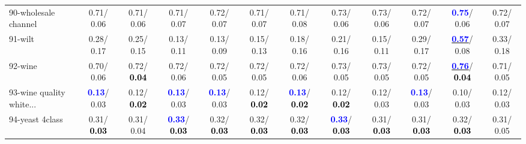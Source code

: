 \begin{table}[h]
\begin{center}
{\begin{tabular}{lc|c|c|c|c|c|c|c|c|c|c}
90-wholesale channel &   0.71/  0.06 &   0.71/  0.06 &   0.71/  0.07 &   0.72/  0.07 &   0.71/  0.07 &   0.71/  0.08 &   0.73/  0.06 &   0.73/  0.06 &   0.72/  0.07 & \textcolor{blue}{\textbf{  0.75}}/  0.06 &   0.72/  0.07 \\
91-wilt &   0.28/  0.17 &   0.25/  0.15 &   0.13/  0.11 &   0.13/  0.09 &   0.15/  0.13 &   0.18/  0.16 &   0.21/  0.16 &   0.15/  0.11 &   0.29/  0.17 & \underline{\textcolor{blue}{\textbf{  0.57}}}/  0.08 &   0.33/  0.18 \\
92-wine &   0.70/  0.06 &   0.72/\textcolor{black}{\textbf{  0.04}} &   0.72/  0.06 &   0.72/  0.05 &   0.72/  0.05 &   0.72/  0.06 &   0.73/  0.05 &   0.73/  0.05 &   0.72/  0.05 & \underline{\textcolor{blue}{\textbf{  0.76}}}/\textcolor{black}{\textbf{  0.04}} &   0.71/  0.05 \\ \hline
93-wine quality white... & \textcolor{blue}{\textbf{  0.13}}/  0.03 &   0.12/\textcolor{black}{\textbf{  0.02}} & \textcolor{blue}{\textbf{  0.13}}/  0.03 & \textcolor{blue}{\textbf{  0.13}}/  0.03 &   0.12/\textcolor{black}{\textbf{  0.02}} & \textcolor{blue}{\textbf{  0.13}}/\textcolor{black}{\textbf{  0.02}} &   0.12/\textcolor{black}{\textbf{  0.02}} &   0.12/  0.03 & \textcolor{blue}{\textbf{  0.13}}/  0.03 &   0.10/  0.03 &   0.12/  0.03 \\
94-yeast 4class &   0.31/\textcolor{black}{\textbf{  0.03}} &   0.31/  0.04 & \textcolor{blue}{\textbf{  0.33}}/\textcolor{black}{\textbf{  0.03}} &   0.32/\textcolor{black}{\textbf{  0.03}} &   0.32/\textcolor{black}{\textbf{  0.03}} &   0.32/\textcolor{black}{\textbf{  0.03}} & \textcolor{blue}{\textbf{  0.33}}/\textcolor{black}{\textbf{  0.03}} &   0.31/\textcolor{black}{\textbf{  0.03}} &   0.31/\textcolor{black}{\textbf{  0.03}} &   0.32/\textcolor{black}{\textbf{  0.03}} &   0.31/  0.05 \\\end{tabular}
}\label{strats2aC4.5w}
\end{center}
\end{table}
